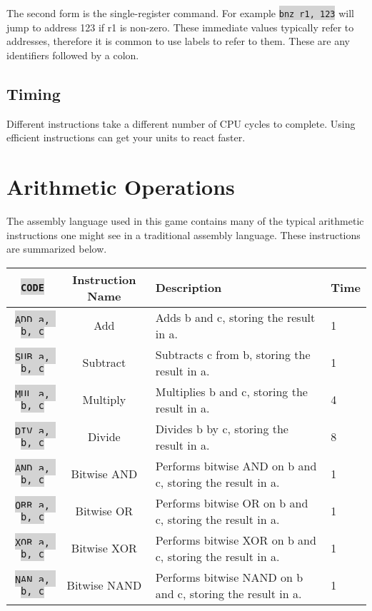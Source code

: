 \documentclass{article}
\newcommand{\vnscode}[1]{\colorbox{lightgray}{\lstinline[language=vns]{#1}}}
\begin{document}
The second form is the single-register command. For example \vnscode{bnz r1,
123} will jump to address 123 if r1 is non-zero. These immediate values
typically refer to addresses, therefore it is common to use labels to refer to
them. These are any identifiers followed by a colon.

\subsection*{Timing}

Different instructions take a different number of CPU cycles to complete. Using
efficient instructions can get your units to react faster.

\section*{Arithmetic Operations}

The assembly language used in this game contains many of the typical
arithmetic instructions one might see in a traditional assembly language. These
instructions are summarized below.

\begin{tabular}{|c|c|l|l|}
    \hline \vnscode{CODE} & Instruction Name & Description & Time \\ \hline
    \vnscode{ADD a, b, c} & Add & Adds b and c, storing the result in a. & 1 \\ \hline
    \vnscode{SUB a, b, c} & Subtract & Subtracts c from b, storing the result in a. & 1 \\ \hline
    \vnscode{MUL a, b, c} & Multiply & Multiplies b and c, storing the result in a. & 4 \\ \hline
    \vnscode{DIV a, b, c} & Divide & Divides b by c, storing the result in a. & 8 \\ \hline
    \vnscode{AND a, b, c} & Bitwise AND & Performs bitwise AND on b and c, storing the result in a. & 1 \\ \hline
    \vnscode{ORR a, b, c} & Bitwise OR & Performs bitwise OR on b and c, storing the result in a. & 1 \\ \hline
    \vnscode{XOR a, b, c} & Bitwise XOR & Performs bitwise XOR on b and c, storing the result in a. & 1 \\ \hline
    \vnscode{NAN a, b, c} & Bitwise NAND & Performs bitwise NAND on b and c, storing the result in a. & 1 \\ \hline
\end{tabular}
\end{document}
